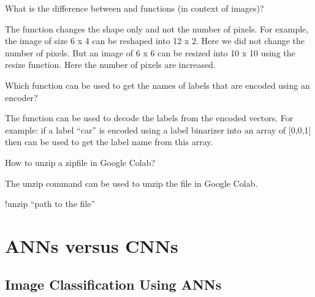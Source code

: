 	\begin{qanda}
		\begin{question}
What is the difference between  and  functions (in context of images)?
		\end{question}
		\begin{answer}
The  function changes the shape only and not the number of pixels.  For example, the image of size 6 x 4 can be reshaped into 12 x 2.  Here we did not change the number of pixels.  But an image of 6 x 6 can be resized into 10 x 10 using the resize function.  Here the number of pixels are increased.
		\end{answer}
	\end{qanda}

	\begin{qanda}
		\begin{question}
Which function can be used to get the names of labels that are encoded using an encoder?
		\end{question}
		\begin{answer}
The  function can be used to decode the labels from the encoded vectors.  For example: if a label ``car'' is encoded using a label binarizer into an array of [0,0,1] then  can be used to get the label name from this array.
		\end{answer}
	\end{qanda}

	\begin{qanda}
		\begin{question}
How to unzip a zipfile in Google Colab?
		\end{question}
		\begin{answer}
The unzip command can be used to unzip the file in Google Colab.
		\begin{code}[\codenumbering]{}
			\codeitemnonumber !unzip ``path to the file''
		\end{code}
		\end{answer}
	\end{qanda}


	\section{ANNs versus CNNs}
	\subsection{Image Classification Using ANNs}
